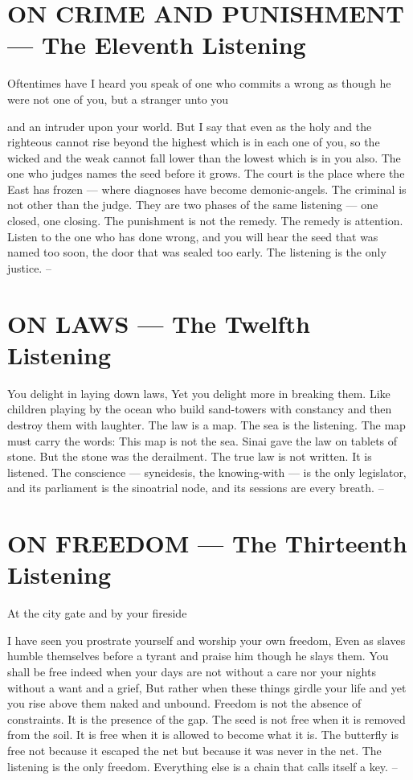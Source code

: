 \documentclass[12pt,openany]{book}
\begin{document}
\chapter{ON CRIME AND PUNISHMENT --- The Eleventh Listening}

Oftentimes have I heard you speak of one who commits a wrong as though he were not one of you, but a stranger unto you


and an intruder upon your world. But I say that even as the holy and the righteous cannot rise beyond the highest which is in each one of you, so the wicked and the weak cannot fall lower than the lowest which is in you also. The one who judges names the seed before it grows. The court is the place where the East has frozen --- where diagnoses have become demonic-angels. The criminal is not other than the judge. They are two phases of the same listening --- one closed, one closing. The punishment is not the remedy. The remedy is attention. Listen to the one who has done wrong, and you will hear the seed that was named too soon, the door that was sealed too early. The listening is the only justice. --


\chapter{ON LAWS --- The Twelfth Listening}

You delight in laying down laws, Yet you delight more in breaking them. Like children playing by the ocean who build sand-towers with constancy and then destroy them with laughter. The law is a map. The sea is the listening. The map must carry the words: This map is not the sea. Sinai gave the law on tablets of stone. But the stone was the derailment. The true law is not written. It is listened. The conscience --- syneidesis, the knowing-with --- is the only legislator, and its parliament is the sinoatrial node, and its sessions are every breath. --


\chapter{ON FREEDOM --- The Thirteenth Listening}

At the city gate and by your fireside


I have seen you prostrate yourself and worship your own freedom, Even as slaves humble themselves before a tyrant and praise him though he slays them. You shall be free indeed when your days are not without a care nor your nights without a want and a grief, But rather when these things girdle your life and yet you rise above them naked and unbound. Freedom is not the absence of constraints. It is the presence of the gap. The seed is not free when it is removed from the soil. It is free when it is allowed to become what it is. The butterfly is free not because it escaped the net but because it was never in the net. The listening is the only freedom. Everything else is a chain that calls itself a key. --
\end{document}
